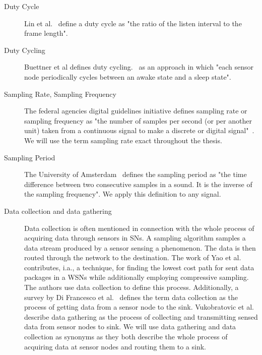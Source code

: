\begin{description}
    \item[Duty Cycle]
        Lin et al.~\cite{lin2004medium} define a duty cycle as "the ratio of
        the listen interval to the frame length". 

    \item[Duty Cycling]
        Buettner et al defines duty cycling.~\cite{buettner2006x} as an
        approach in which "each sensor node periodically cycles between an
        awake state and a sleep state".

    \item[Sampling Rate, Sampling Frequency]
        The federal agencies digital guidelines initiative defines sampling
        rate or sampling frequency as "the number of samples per second (or per
        another unit) taken from a continuous signal to make a discrete or
        digital signal"~\cite{samplingrate}. We will use the term sampling rate
        exact throughout the thesis.
 
    \item[Sampling Period]
        The University of Amsterdam~\cite{samplingperiod} defines the sampling
        period as "the time difference between two consecutive samples in a
        sound. It is the inverse of the sampling frequency". We apply this
        definition to any signal.

    \item[Data collection and data gathering] 
        Data collection is often mentioned in connection with the whole process
        of acquiring data through sensors in \acp{SN}. A sampling algorithm samples a data stream produced by a sensor sensing a phenomenon.
        The data is then routed through the network to the destination. The
        work of Yao et al.~\cite{yao2015edal} contributes, i.a., a technique,
        for finding the lowest cost path for sent data packages in a \acp{WSN}
        while additionally employing compressive sampling. The authors use data
        collection to define this process. Additionally, a survey by Di
        Francesco et al.~\cite{di2011data} defines the term data collection as
        the process of getting data from a sensor node to the sink.
        Vukobratovic et al.~\cite{vukobratovic2010rateless, zhang2016data}
        describe data gathering as the process of collecting and transmitting
        sensed data from sensor nodes to sink. We will use data gathering and
        data collection as synonyms as they both describe the whole process of
        acquiring data at sensor nodes and routing them to a sink.


\end{description}
